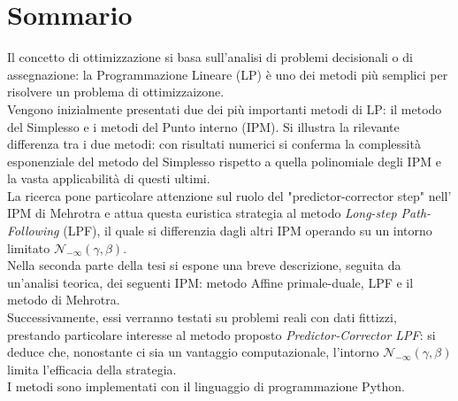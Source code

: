 \documentclass[a4paper,10 pt,titlepage,twoside]{book}
\theoremstyle{plain}
\theoremstyle{definition}
\theoremstyle{remark}
\begin{document}
\chapter*{Sommario}
Il concetto di ottimizzazione si basa sull'analisi di problemi decisionali o di assegnazione: la Programmazione Lineare (LP) è uno dei metodi più semplici per risolvere un problema di ottimizzaizone.\\ 
Vengono inizialmente presentati due dei più importanti metodi di LP: il metodo del Simplesso e i metodi del Punto interno (IPM). Si illustra la rilevante differenza tra i due metodi: con risultati numerici si conferma la complessità esponenziale del metodo del Simplesso rispetto a quella polinomiale degli IPM e la vasta applicabilità di questi ultimi.\\
La ricerca pone particolare attenzione sul ruolo del "predictor-corrector step" nell' IPM di Mehrotra e attua questa euristica strategia al metodo \textit{Long-step Path-Following} (LPF), il quale si differenzia dagli altri  IPM operando su un intorno limitato $\mathcal{N}_{-\infty}(\gamma,\beta)$.\\
Nella seconda parte della tesi si espone una breve descrizione, seguita da un'analisi teorica, dei seguenti IPM: metodo Affine primale-duale, LPF e il metodo di Mehrotra.\\
Successivamente, essi verranno testati su problemi reali con dati fittizzi, prestando particolare interesse al metodo proposto \textit{Predictor-Corrector LPF}: si deduce che, nonostante ci sia un vantaggio computazionale, l'intorno $\mathcal{N}_{-\infty}(\gamma,\beta)$ limita l'efficacia della strategia.\\   
I metodi sono implementati con il linguaggio di programmazione Python. 
\end{document}
